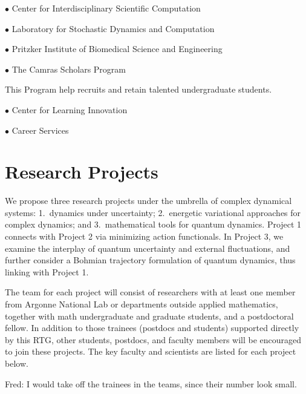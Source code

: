 \documentclass[11pt]{NSFamsart}
\newcommand{\FredNote}[1]{{\color{blue} Fred: #1}}
\begin{document}
 $\bullet$ Center for Interdisciplinary Scientific Computation
 
 $\bullet$ Laboratory for Stochastic Dynamics and Computation
 
 $\bullet$ Pritzker Institute of Biomedical Science and Engineering
 
  $\bullet$  The Camras Scholars Program
  
  This Program help recruits and retain talented undergraduate students. 
  
  $\bullet$  Center for Learning Innovation 
 
 
 $\bullet$   Career Services
 \fi
 
 
 




\section{Research Projects } \label{sec:researchproblems}

We propose three research projects under the umbrella of complex dynamical systems: 1.\ dynamics under uncertainty; 2.\  energetic variational approaches for complex dynamics; and 3.\ mathematical tools for quantum dynamics. Project 1 connects with Project 2 via minimizing action functionals. In Project 3, we examine the interplay of quantum uncertainty and external fluctuations, and further consider a Bohmian trajectory formulation of quantum dynamics, thus linking with Project 1. 

The team for each project will consist of researchers with at least one member
from Argonne National Lab or departments outside applied mathematics, together with math undergraduate and graduate students, and a postdoctoral
fellow. In addition to those trainees (postdocs and students) supported directly by this RTG, other students, postdocs, and faculty members will be encouraged to join these projects.  The key faculty and scientists are listed for each project below.

\FredNote{I would take off the trainees in the teams, since their number look small.}

\iffalse  
 While there   may be thematic driven differences on the approach to deliver
knowledge and do research, each group share a similar year-round schedule that will allow awareness
and exchange of ideas throughout the academic year, mainly at the RTG graduate seminar.   Finally each summer program is centered on
an intense 2-week period. \FredNote{What does this mean?} Participating undergraduates will have a unique opportunity to work in a serious
way on two topics, which we believe to be highly beneficial.
\fi
 
\end{document}
